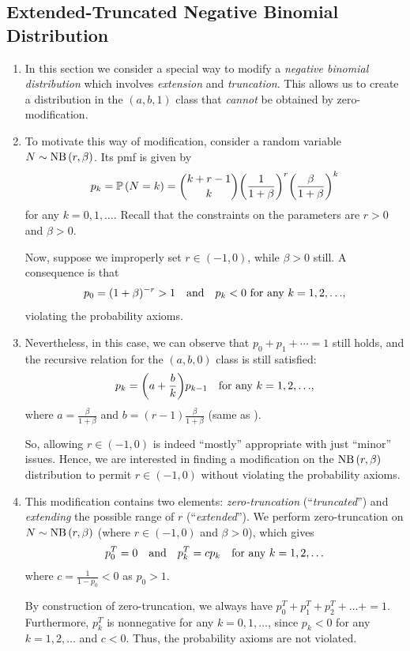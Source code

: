 \subsection{Extended-Truncated Negative Binomial Distribution}
\begin{enumerate}
\item In this section we consider a special way to modify a \emph{negative
binomial distribution} which involves \emph{extension} and \emph{truncation}.
This allows us to create a distribution in the \((a,b,1)\) class that
\emph{cannot} be obtained by zero-modification.

\item To motivate this way of modification, consider a random variable
\(N\sim\operatorname{NB}\left(r,\beta\right)\). Its pmf is given by
\[
p_k=\mathbb{P}\left(N=k\right)=\binom{k+r-1}{k}\qty(\frac{1}{1+\beta})^{r}\qty(\frac{\beta}{1+\beta})^{k}
\]
for any \(k=0,1,\dotsc\). Recall that the constraints on the parameters are \(r>0\)
and \(\beta>0\).

Now, suppose we improperly set \(r\in(-1,0)\), while \(\beta>0\) still. A
consequence is that
\[
p_0=(1+\beta)^{-r}>1\qqtext{and}p_k<0\text{ for any \(k=1,2,\dotsc\)},
\]
violating the probability axioms.

\item Nevertheless, in this case, we can observe that \(p_0+p_1+\dotsb=1\)
still holds, and the recursive relation for the \((a,b,0)\) class is still
satisfied:
\[
p_k=\qty(a+\frac{b}{k})p_{k-1}\quad\text{for any \(k=1,2,\dotsc\)},
\]
where \(\displaystyle a=\frac{\beta}{1+\beta}\) and \(\displaystyle
b=(r-1)\frac{\beta}{1+\beta}\) (same as ). 

So, allowing \(r\in(-1,0)\) is indeed ``mostly'' appropriate with just
``minor'' issues. Hence, we are interested in finding a modification on the
\(\operatorname{NB}\left(r,\beta\right)\) distribution to permit \(r\in(-1,0)\) without violating the
probability axioms.

\item This modification contains two elements: \emph{zero-truncation}
(``\emph{truncated}'') and \emph{extending} the possible range of \(r\)
(``\emph{extended}''). We perform zero-truncation on \(N\sim\operatorname{NB}\left(r,\beta\right)\)
(where \(r\in(-1,0)\) and \(\beta>0\)), which gives
\[
p_0^T=0\qqtext{and}p_k^T=cp_k\quad\text{for any \(k=1,2,\dotsc\)}
\]
where \(\displaystyle c=\frac{1}{1-p_0}<0\) as \(p_0>1\).

\begin{note}
By construction of zero-truncation, we always have
\(p_0^T+p_1^T+p_2^T+\dots+=1\). Furthermore, \(p_k^T\) is nonnegative for any
\(k=0,1,\dotsc\), since \(p_k<0\) for any \(k=1,2,\dotsc\) and \(c<0\). Thus, the
probability axioms are not violated.
\end{note}


\end{enumerate}
